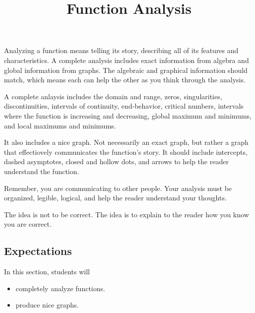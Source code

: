 \documentclass{ximera}
\title{Function Analysis}
\begin{document}
\begin{abstract}
\end{abstract}
\maketitle




Analyzing a function means telling its story, describing all of its features and characteristics.  A complete analysis includes exact information from algebra and global information from graphs.  The algebraic and graphical information should match, which means each can help the other as you think through the analysis.

A complete anlaysis includes the domain and range, zeros, singularities, discontinuities, intervals of continuity, end-behavior, critical numbers, intervals where the function is increasing and decreasing, global maximum and minimums, and local maximums and minimums.

It also includes a nice graph.  Not necessarily an exact graph, but rather a graph that effectiovely communicates the function's story. It should include intercepts, dashed asymptotes, closed and hollow dots, and arrows to help the reader understand the function.  

Remember, you are communicating to other people. Your analysis must be organized, legible, logical, and help the reader understand your thoughts.

The idea is not to be correct.  The idea is to explain to the reader how you know you are correct.

















\subsection{Expectations}





\begin{sectionOutcomes}
In this section, students will 

\begin{itemize}
\item completely analyze functions.
\item produce nice graphs.
\end{itemize}
\end{sectionOutcomes}
\end{document}
